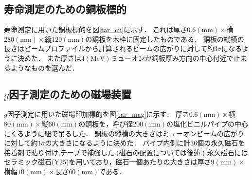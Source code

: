 



%

\subsection{寿命測定のための銅板標的}
寿命測定に用いた銅板標的を図\ref{tar_cu}に示す．
これは厚さ$0.6(\mathrm{mm})\times$横$280(\mathrm{mm})\times$縦$120(\mathrm{mm})$の銅板を木枠に固定したものである．
銅板の縦横の長さはビームプロファイルから計算されるビームの広がりに対して約$3\sigma$になるように決めた．
また厚さは$4(\mathrm{MeV})$ミューオンが銅板厚み方向の中心付近で止まるようなものを選んだ．
\subsection{$g$因子測定のための磁場装置}
$g$因子測定に用いた磁場印加標的を図\ref{tar_mag}に示す．
厚さ$0.6(\mathrm{mm})\times$横$80(\mathrm{mm})\times$縦$60(\mathrm{mm})$の銅板を，呼び径$200(\mathrm{mm})$の塩化ビニルパイプの中心にくるように紐で吊るした．
銅板の縦横の大きさはミューオンビームの広がりに対して約$1\sigma$の大きさになるように決めた．
パイプ内側に計36個の永久磁石を接着剤で貼り付け,テープで補強した.(磁石の配置については後述.)
永久磁石にはセラミック磁石(Y25)を用いており，磁石一個あたりの大きさは厚さ$9(\mathrm{mm})\times$横幅$10(\mathrm{mm})\times$長さ$60(\mathrm{mm})$である．


